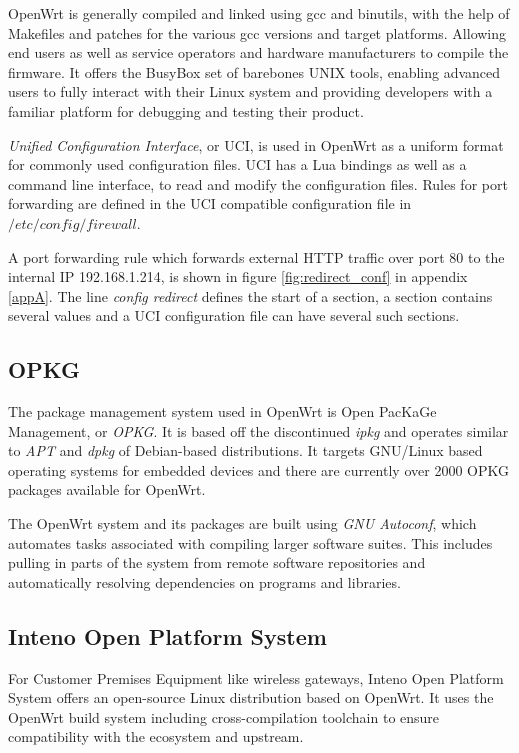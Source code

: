 \documentclass[a4paper,11pt,makeidx]{kth-bcs}
\begin{document}
OpenWrt is generally compiled and linked using gcc and binutils, with the help of Makefiles and patches for the various gcc versions and target platforms.
Allowing end users as well as service operators and hardware manufacturers to compile the firmware.
It offers the BusyBox set of barebones UNIX tools, enabling advanced users to fully interact with their Linux system and providing developers with a familiar platform for debugging and testing their product.\cite{OpenWrt:structure_design}

\emph{Unified Configuration Interface}, or UCI, is used in OpenWrt as a uniform format for commonly used configuration files.
UCI has a Lua bindings as well as a command line interface, to read and modify the configuration files.
Rules for port forwarding are defined in the UCI compatible configuration file in $/etc/config/firewall$.

A port forwarding rule which forwards external HTTP traffic over port 80 to the internal IP 192.168.1.214, is shown in figure \ref{fig:redirect_conf} in appendix \ref{appA}.
The line \emph{config redirect} defines the start of a section, a section contains several values and a UCI configuration file can have several such sections.

\subsection{OPKG}
The package management system used in OpenWrt is Open PacKaGe Management, or \emph{OPKG}. It is based off the discontinued \emph{ipkg} and operates similar to \emph{APT} and \emph{dpkg} of Debian-based distributions.
It targets GNU/Linux based operating systems for embedded devices and there are currently over 2000 OPKG packages available for OpenWrt.

The OpenWrt system and its packages are built using \emph{GNU Autoconf}, which automates tasks associated with compiling larger software suites.
This includes pulling in parts of the system from remote software repositories and automatically resolving dependencies on programs and libraries.

\subsection{Inteno Open Platform System}
For Customer Premises Equipment like wireless gateways, Inteno Open Platform System offers an open-source Linux distribution based on OpenWrt.
It uses the OpenWrt build system including cross-compilation toolchain to ensure compatibility with the ecosystem and upstream.
\end{document}
